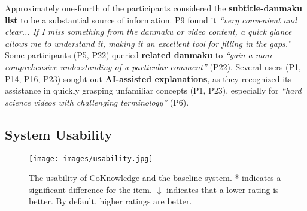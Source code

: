 Approximately one-fourth of the participants considered the \textbf{subtitle-danmaku list} to be a substantial source of information. P9 found it \textit{``very convenient and clear... If I miss something from the danmaku or video content, a quick glance allows me to understand it, making it an excellent tool for filling in the gaps.''}
Some participants (P5, P22) queried \textbf{related danmaku} to \textit{``gain a more comprehensive understanding of a particular comment''} (P22).
Several users (P1, P14, P16, P23) sought out \textbf{AI-assisted explanations}, as they recognized its assistance in quickly grasping unfamiliar concepts (P1, P23), especially for \textit{``hard science videos with challenging terminology''} (P6).



\subsection{System Usability}
\label{sec:usability}
\begin{figure*}[h]
  \centering
  \texttt{[image: images/usability.jpg]}
  \caption{The usability of CoKnowledge and the baseline system. * indicates a significant difference for the item. $\downarrow$  indicates that a lower rating is better. By default, higher ratings are better.}\label{fig:usability}
\end{figure*}


